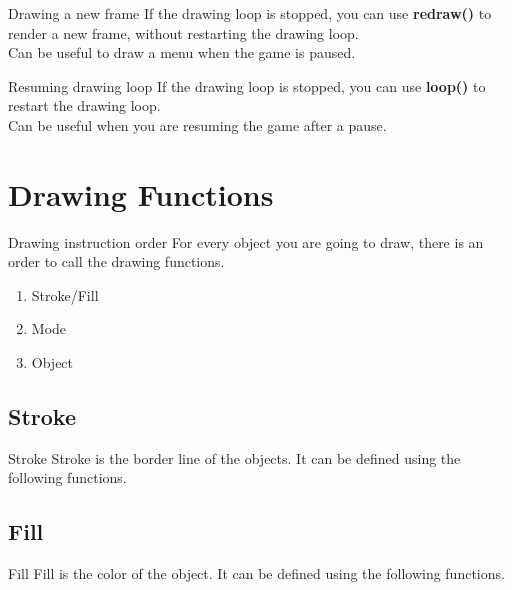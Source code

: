 \documentclass{beamer}
\begin{document}
\begin{frame}{Drawing a new frame}
If the drawing loop is stopped, you can use \textbf{redraw()} to 
render a new frame, without restarting the drawing loop.\\

Can be useful to draw a menu when the game is paused.
\end{frame}

\begin{frame}{Resuming drawing loop}
If the drawing loop is stopped, you can use \textbf{loop()} to
restart the drawing loop.\\

Can be useful when you are resuming the game after a pause.
\end{frame}

\section{Drawing Functions}

\begin{frame}{Drawing instruction order}
For every object you are going to draw, there is an order to call
the drawing functions.\\

\begin{enumerate}
\item{Stroke/Fill}
\item{Mode}
\item{Object}
\end{enumerate}
\end{frame}

\subsection{Stroke}

\begin{frame}{Stroke}
Stroke is the border line of the objects. It can be defined using the following functions.\\

\lstStroke
\end{frame}

\subsection{Fill}

\begin{frame}{Fill}
Fill is the color of the object. It can be defined using the following functions.\\

\lstFill
\end{frame}
\end{document}
